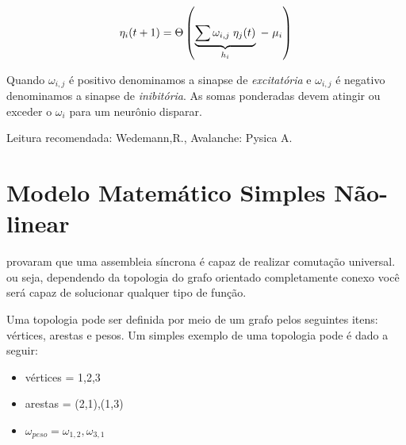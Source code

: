 \begin{eqnarray}
\centering
\eta_{i}(t+1)= \Theta\left( \underbrace{\sum \omega_{i,j}\; \eta_{j}(t)}_{h_{i}}\;-\;\mu_{i}\right)
\end{eqnarray}

Quando $\omega_{i,j}$ é positivo denominamos a sinapse de \textit{excitatória} e $\omega_{i,j}$ é negativo denominamos a sinapse de \textit{inibitória}. As somas ponderadas devem atingir ou exceder o $\omega_{i}$ para um neurônio disparar.

Leitura recomendada: Wedemann,R., Avalanche: Pysica A. 

\section{Modelo Matemático Simples Não-linear}

\citet{McCulloch1943} provaram que uma assembleia síncrona é capaz de realizar comutação universal. ou seja, dependendo da topologia do grafo orientado completamente conexo você será capaz de solucionar qualquer tipo de função. 

Uma topologia pode ser definida por meio de um grafo pelos seguintes itens: vértices, arestas e pesos. Um simples exemplo de uma topologia pode é dado a seguir:

\begin{itemize}
	\item vértices = {1,2,3}
	\item arestas = (2,1),(1,3)
	\item $\omega_{peso} = \omega_{1,2},\omega_{3,1} $
\end{itemize}


 
 

